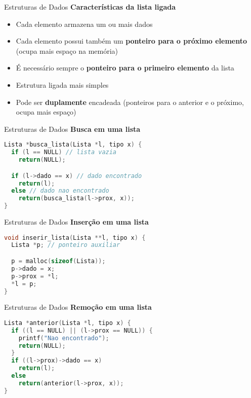 \documentclass[10pt]{beamer}
\begin{document}
\begin{frame}{Estruturas de Dados}
  \huge
  \textbf{Características da lista ligada}
  \vfill
  \large
  \begin{itemize}
    \item Cada elemento armazena um ou mais dados
    \item Cada elemento possui também um \textbf{ponteiro para o próximo elemento} (ocupa mais espaço na memória)
    \item É necessário sempre o \textbf{ponteiro para o primeiro elemento} da lista
    \item Estrutura ligada mais simples
    \item Pode ser \textbf{duplamente} encadeada (ponteiros para o anterior e o próximo, ocupa mais espaço)
  \end{itemize}

\end{frame}

\begin{frame}[fragile]{Estruturas de Dados}
  \huge
  \textbf{Busca em uma lista}
  \vfill
  \large
  \begin{lstlisting}[language=C]
Lista *busca_lista(Lista *l, tipo x) {
  if (l == NULL) // lista vazia
    return(NULL);

  if (l->dado == x) // dado encontrado
    return(l);
  else // dado nao encontrado
    return(busca_lista(l->prox, x));
}
  \end{lstlisting}
\end{frame}

\begin{frame}[fragile]{Estruturas de Dados}
  \huge
  \textbf{Inserção em uma lista}
  \vfill
  \large
  \begin{lstlisting}[language=C]
void inserir_lista(Lista **l, tipo x) {
  Lista *p; // ponteiro auxiliar

  p = malloc(sizeof(Lista));
  p->dado = x;
  p->prox = *l;
  *l = p;
}
  \end{lstlisting}
\end{frame}

\begin{frame}[fragile]{Estruturas de Dados}
  \huge
  \textbf{Remoção em uma lista}
  \vfill
  \large
  \begin{lstlisting}[language=C]
Lista *anterior(Lista *l, tipo x) {
  if ((l == NULL) || (l->prox == NULL)) {
    printf("Nao encontrado");
    return(NULL);
  }
  if ((l->prox)->dado == x)
    return(l);
  else
    return(anterior(l->prox, x));
}
  \end{lstlisting}
\end{frame}
\end{document}
